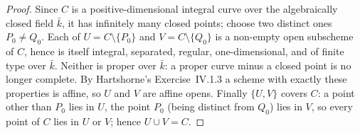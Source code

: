 \begin{proof}
  Since \(C\) is a positive-dimensional integral curve over the
  algebraically closed field \(\bar k\), it has infinitely many closed
  points; choose two distinct ones \(P_0 \ne Q_0\). Each of
  \(U = C \setminus \{P_0\}\) and \(V = C \setminus \{Q_0\}\) is a
  non-empty open subscheme of \(C\), hence is itself integral,
  separated, regular, one-dimensional, and of finite type over
  \(\bar k\). Neither is proper over \(\bar k\): a proper curve minus a
  closed point is no longer complete. By Hartshorne's Exercise~IV.1.3 a
  scheme with exactly these properties is affine, so \(U\) and \(V\) are
  affine opens. Finally \(\{U, V\}\) covers \(C\): a point other than
  \(P_0\) lies in \(U\), the point \(P_0\) (being distinct from
  \(Q_0\)) lies in \(V\), so every point of \(C\) lies in \(U\) or
  \(V\); hence \(U \cup V = C\).
\end{proof}

